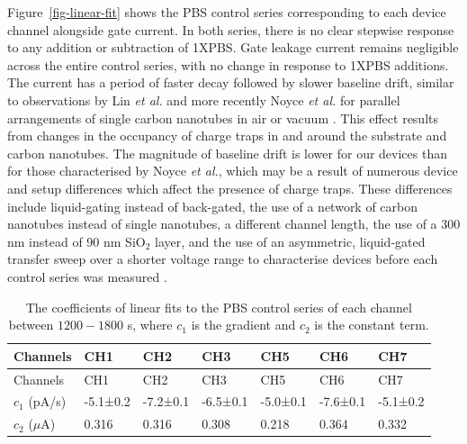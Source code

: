 \documentclass[
  a4paper,
]{scrbook}
\begin{document}
Figure~\ref{fig-linear-fit} shows the PBS control series corresponding
to each device channel alongside gate current. In both series, there is
no clear stepwise response to any addition or subtraction of 1XPBS. Gate
leakage current remains negligible across the entire control series,
with no change in response to 1XPBS additions. The current has a period
of faster decay followed by slower baseline drift, similar to
observations by Lin \emph{et al.} and more recently Noyce \emph{et al.}
for parallel arrangements of single carbon nanotubes in air or vacuum
\autocite{Lin2006,Noyce2019}. This effect results from changes in the
occupancy of charge traps in and around the substrate and carbon
nanotubes. The magnitude of baseline drift is lower for our devices than
for those characterised by Noyce \emph{et al.}, which may be a result of
numerous device and setup differences which affect the presence of
charge traps. These differences include liquid-gating instead of
back-gated, the use of a network of carbon nanotubes instead of single
nanotubes, a different channel length, the use of a 300 nm instead of 90
nm SiO\(_2\) layer, and the use of an asymmetric, liquid-gated transfer
sweep over a shorter voltage range to characterise devices before each
control series was measured \autocite{Noyce2019}.

\hypertarget{tbl-linear-fits}{}
\begin{longtable}[]{@{}lllllll@{}}
\caption{\label{tbl-linear-fits}The coefficients of linear fits to the
PBS control series of each channel between \(1200-1800\) s, where
\(c_1\) is the gradient and \(c_2\) is the constant term.\\
}\tabularnewline
\toprule\noalign{}
Channels & CH1 & CH2 & CH3 & CH5 & CH6 & CH7 \\
\midrule\noalign{}
\endfirsthead
\toprule\noalign{}
Channels & CH1 & CH2 & CH3 & CH5 & CH6 & CH7 \\
\midrule\noalign{}
\endhead
\bottomrule\noalign{}
\endlastfoot
\(c_1\) (pA/s) & -5.1±0.2 & -7.2±0.1 & -6.5±0.1 & -5.0±0.1 & -7.6±0.1 &
-5.1±0.2 \\
\(c_2\) (\(\mu\)A) & 0.316 & 0.316 & 0.308 & 0.218 & 0.364 & 0.332 \\
\end{longtable}
\end{document}
